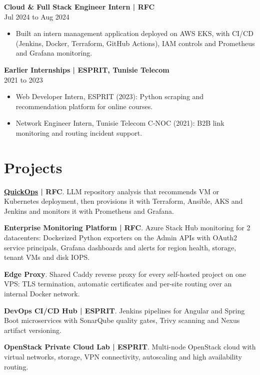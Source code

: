 \documentclass[11pt,a4paper]{article}
\newcommand{\role}[3]{\Needspace{5\baselineskip}\textbf{#1 | #2}\\#3\par}
\newcommand{\group}[1]{\Needspace{4\baselineskip}\vspace{4pt}{\bfseries\color{accent}#1}\par}
\newcommand{\project}[2]{\Needspace{3\baselineskip}\textbf{#1}. #2\par}
\begin{document}
\role{Cloud \& Full Stack Engineer Intern}{RFC}{Jul 2024 to Aug 2024}
\begin{itemize}
\item Built an intern management application deployed on AWS EKS, with CI/CD (Jenkins, Docker, Terraform, GitHub Actions), IAM controls and Prometheus and Grafana monitoring.
\end{itemize}

\role{Earlier Internships}{ESPRIT, Tunisie Telecom}{2021 to 2023}
\begin{itemize}
\item Web Developer Intern, ESPRIT (2023): Python scraping and recommendation platform for online courses.
\item Network Engineer Intern, Tunisie Telecom C-NOC (2021): B2B link monitoring and routing incident support.
\end{itemize}

\section{Projects}
\group{Cloud and DevOps}
\project{\href{https://github.com/tamim-hmizi/QuickOps-Frontend}{QuickOps} | RFC}{LLM repository analysis that recommends VM or Kubernetes deployment, then provisions it with Terraform, Ansible, AKS and Jenkins and monitors it with Prometheus and Grafana.}
\project{Enterprise Monitoring Platform | RFC}{Azure Stack Hub monitoring for 2 datacenters: Dockerized Python exporters on the Admin APIs with OAuth2 service principals, Grafana dashboards and alerts for region health, storage, tenant VMs and disk IOPS.}
\project{Edge Proxy}{Shared Caddy reverse proxy for every self-hosted project on one VPS: TLS termination, automatic certificates and per-site routing over an internal Docker network.}
\project{DevOps CI/CD Hub | ESPRIT}{Jenkins pipelines for Angular and Spring Boot microservices with SonarQube quality gates, Trivy scanning and Nexus artifact versioning.}
\project{OpenStack Private Cloud Lab | ESPRIT}{Multi-node OpenStack cloud with virtual networks, storage, VPN connectivity{}, autoscaling and high availability routing.}
\end{document}
